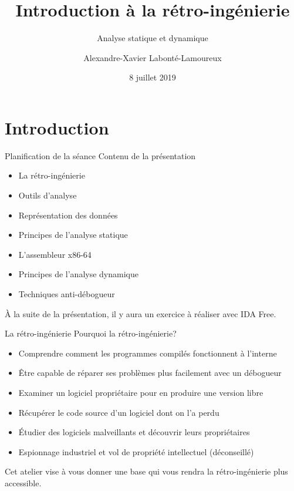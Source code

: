 \documentclass[10pt,xcolor={table,dvipsnames},t]{beamer}
\title[Your Short Title]{Introduction à la rétro-ingénierie}
\subtitle{Analyse statique et dynamique}
\author{Alexandre-Xavier Labonté-Lamoureux}
\institute{CEDILLE et Délégation des compétitions en informatique de l'ÉTS}
\date{8 juillet 2019}
\begin{document}
\begin{frame}
  \titlepage
\end{frame}


\section{Introduction}

\begin{frame}{Planification de la séance}
    Contenu de la présentation
    \begin{itemize}
        \item La rétro-ingénierie
        \item Outils d'analyse
        \item Représentation des données
        \item Principes de l'analyse statique
        \item L'assembleur x86-64
        \item Principes de l'analyse dynamique
        \item Techniques anti-débogueur
        \newline
    \end{itemize}
À la suite de la présentation, il y aura un exercice à réaliser avec IDA Free.


\end{frame}

\begin{frame}{La rétro-ingénierie}
    Pourquoi la rétro-ingénierie?
    \begin{itemize}
        \item Comprendre comment les programmes compilés fonctionnent à l'interne
        \item Être capable de réparer ses problèmes plus facilement avec un débogueur
        \item Examiner un logiciel propriétaire pour en produire une version libre
        \item Récupérer le code source d'un logiciel dont on l'a perdu
        \item Étudier des logiciels malveillants et découvrir leurs propriétaires
        \item Espionnage industriel et vol de propriété intellectuel (déconseillé)
        \newline
    \end{itemize}
    Cet atelier vise à vous donner une base qui vous rendra la rétro-ingénierie plus accessible.
\end{frame}
\end{document}
